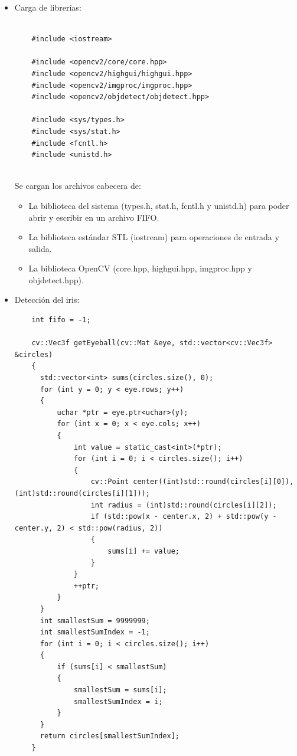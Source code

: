 \begin{itemize}

    \item Carga de librerías: \\

   \begin{verbatim}

    #include <iostream>

    #include <opencv2/core/core.hpp>
    #include <opencv2/highgui/highgui.hpp>
    #include <opencv2/imgproc/imgproc.hpp>
    #include <opencv2/objdetect/objdetect.hpp>
    
    #include <sys/types.h>
    #include <sys/stat.h>
    #include <fcntl.h>
    #include <unistd.h>
    
    \end{verbatim}
    
    Se cargan los archivos cabecera de:
    \begin{itemize}
        \item La biblioteca del sistema (types.h, stat.h, fcntl.h y unistd.h) para poder abrir y escribir en un archivo FIFO.
        \item La biblioteca estándar STL (iostream) para operaciones de entrada y salida.
        \item La biblioteca OpenCV (core.hpp, highgui.hpp, imgproc.hpp y objdetect.hpp). \\
    \end{itemize}
   
   \item Detección del iris: \\
   
    \begin{verbatim}
    int fifo = -1;

    cv::Vec3f getEyeball(cv::Mat &eye, std::vector<cv::Vec3f> &circles)
    {
      std::vector<int> sums(circles.size(), 0);
      for (int y = 0; y < eye.rows; y++)
      {
          uchar *ptr = eye.ptr<uchar>(y);
          for (int x = 0; x < eye.cols; x++)
          {
              int value = static_cast<int>(*ptr);
              for (int i = 0; i < circles.size(); i++)
              {
                  cv::Point center((int)std::round(circles[i][0]), (int)std::round(circles[i][1]));
                  int radius = (int)std::round(circles[i][2]);
                  if (std::pow(x - center.x, 2) + std::pow(y - center.y, 2) < std::pow(radius, 2))
                  {
                      sums[i] += value;
                  }
              }
              ++ptr;
          }
      }
      int smallestSum = 9999999;
      int smallestSumIndex = -1;
      for (int i = 0; i < circles.size(); i++)
      {
          if (sums[i] < smallestSum)
          {
              smallestSum = sums[i];
              smallestSumIndex = i;
          }
      }
      return circles[smallestSumIndex];
    }
    \end{verbatim}
   

\end{itemize}
